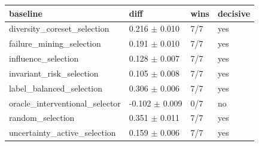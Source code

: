 \begin{tabular}{llll}
\toprule
baseline & diff & wins & decisive \\
\midrule
diversity\_coreset\_selection & 0.216 $\pm$ 0.010 & 7/7 & yes \\
failure\_mining\_selection & 0.191 $\pm$ 0.010 & 7/7 & yes \\
influence\_selection & 0.128 $\pm$ 0.007 & 7/7 & yes \\
invariant\_risk\_selection & 0.105 $\pm$ 0.008 & 7/7 & yes \\
label\_balanced\_selection & 0.306 $\pm$ 0.006 & 7/7 & yes \\
oracle\_interventional\_selector & -0.102 $\pm$ 0.009 & 0/7 & no \\
random\_selection & 0.351 $\pm$ 0.011 & 7/7 & yes \\
uncertainty\_active\_selection & 0.159 $\pm$ 0.006 & 7/7 & yes \\
\bottomrule
\end{tabular}
